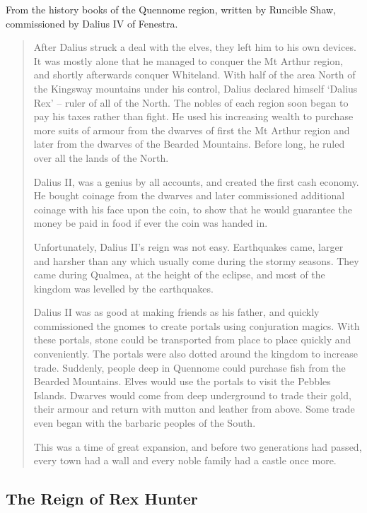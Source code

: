 \begin{multicols}{2}
From the history books of the Quennome region, written by Runcible Shaw, commissioned by Dalius IV of Fenestra.

\begin{quotation}

	After Dalius struck a deal with the elves, they left him to his own devices.
	It was mostly alone that he managed to conquer the Mt Arthur region, and shortly afterwards conquer Whiteland.
	With half of the area North of the Kingsway mountains under his control, Dalius declared himself `Dalius Rex' -- ruler of all of the North.
	The nobles of each region soon began to pay his taxes rather than fight.
	He used his increasing wealth to purchase more suits of armour from the dwarves of first the Mt Arthur region and later from the dwarves of the Bearded Mountains.
	Before long, he ruled over all the lands of the North.

	Dalius II, was a genius by all accounts, and created the first cash economy.
	He bought coinage from the dwarves and later commissioned additional coinage with his face upon the coin, to show that he would guarantee the money be paid in food if ever the coin was handed in.

	Unfortunately, Dalius II's reign was not easy.
	Earthquakes came, larger and harsher than any which usually come during the stormy seasons.
	They came during Qualmea, at the height of the eclipse, and most of the kingdom was levelled by the earthquakes.

	Dalius II was as good at making friends as his father, and quickly commissioned the gnomes to create portals using conjuration magics.
	With these portals, stone could be transported from place to place quickly and conveniently.
	The portals were also dotted around the kingdom to increase trade.
	Suddenly, people deep in Quennome could purchase fish from the Bearded Mountains.
	Elves would use the portals to visit the Pebbles Islands.
	Dwarves would come from deep underground to trade their gold, their armour and return with mutton and leather from above.
	Some trade even began with the barbaric peoples of the South.

	This was a time of great expansion, and before two generations had passed, every town had a wall and every noble family had a castle once more.

\end{quotation}

\subsection{The Reign of Rex Hunter}


\end{multicols}
